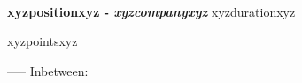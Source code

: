 \textbf{\\ xyzpositionxyz - \textit{xyzcompanyxyz}}
\hfill xyzdurationxyz
\begin{itemize}
xyzpointsxyz
\end{itemize}
-----
Inbetween: \vspace{-8pt}
